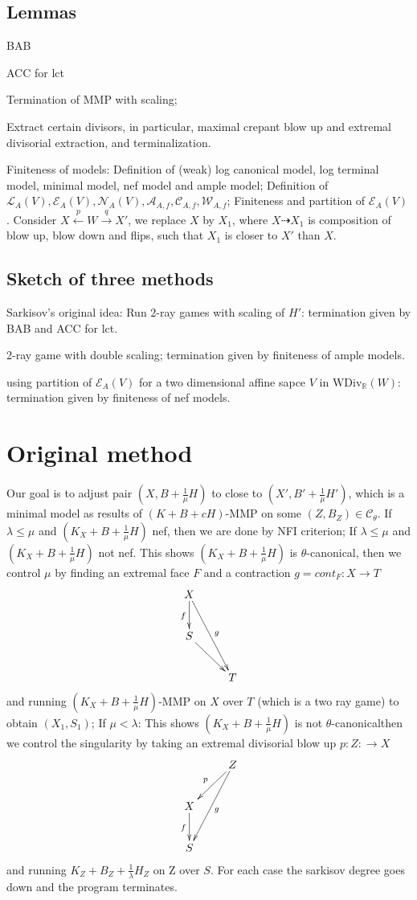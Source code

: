 \documentclass{article}
\begin{document}
\subsection{Lemmas}

BAB

ACC for lct

Termination of MMP with scaling;

Extract certain divisors, in particular, maximal crepant blow up and extremal divisorial extraction, and terminalization.

Finiteness of models: Definition of (weak) log canonical model, log terminal model, minimal model, nef model and ample model; Definition of $ \mathcal{L}_A(V),\mathcal{E}_A(V),\mathcal{N}_A(V),\mathcal{A}_{A,f},\mathcal{C}_{A,f},\mathcal{W}_{A,f} $; Finiteness and partition of $ \mathcal{E}_A(V) $.
Consider $ X\xleftarrow{p}W\xrightarrow{q}X' $, we replace $ X $ by $ X_1 $, where $ X\dashrightarrow X_1 $ is composition of blow up, blow down and flips, such that $ X_1 $ is closer to $ X' $ than $ X $.
\subsection{Sketch of three methods}	

Sarkisov's original idea: Run 2-ray games with scaling of $ H' $: termination given by BAB and ACC for lct.

2-ray game with double scaling; termination given by finiteness of ample models.

using partition of $ \mathcal{E}_A(V) $ for a two dimensional affine sapce $ V $ in $ \mathrm{WDiv}_\mathbb{R}(W) $: termination given by finiteness of nef models.

\section{Original method}

Our goal is to adjust pair $ (X,B+\frac{1}{\mu}H) $ to close to $ (X',B'+\frac{1}{\mu}H') $, which is a minimal model as results of $ (K+B+cH) $-MMP on some $ (Z,B_Z)\in \mathcal{C}_\theta $. If $ \lambda \leqslant \mu $ and $ (K_X+B+\frac{1}{\mu} H) $  nef, then we are done by NFI criterion; If $ \lambda \leqslant \mu $ and $ (K_X+B+\frac{1}{\mu} H) $  not nef. This shows $ (K_X+B+\frac{1}{\mu} H) $ is $ \theta $-canonical, then we control $ \mu $ by  finding an extremal face $ F $ and a contraction $ g=cont_F:X\to T $
$$ \xymatrix{
X\ar[d]_f\ar[ddr]^g&\\
S\ar[dr]&\\
&T }$$
and  running $ (K_X+B+\frac{1}{\mu} H) $-MMP on $ X $ over $ T $ (which is  a two ray game) to obtain $ (X_1,S_1) $; If $ \mu <\lambda $: This shows $ (K_X+B+\frac{1}{\mu} H) $ is not  $ \theta $-canonicalthen we control the singularity by taking an extremal divisorial blow up $ p:Z:\to X $ 
$$ \xymatrix{
&Z\ar[ld]_p\ar[ldd]^g\\
X\ar[d]_f&\\
S} $$
and running $ K_Z+B_Z+\frac{1}{\lambda}H_Z $ on Z over $ S $. For each case the sarkisov degree goes down and the program terminates.
\end{document}
